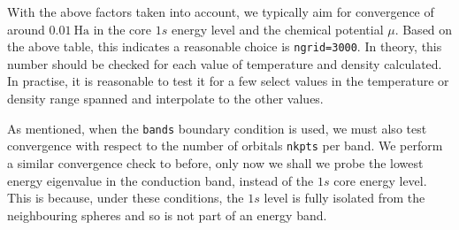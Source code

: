 \documentclass[preprint,aps]{revtex4-2}
\begin{document}
With the above factors taken into account, we typically aim for
convergence of around \(0.01\ \textrm{Ha}\) in the core \(1s\) energy
level and the chemical potential \(\mu\). Based on the above table, this
indicates a reasonable choice is \texttt{ngrid=3000}. In theory, this
number should be checked for each value of temperature and density
calculated. In practise, it is reasonable to test it for a few select
values in the temperature or density range spanned and interpolate to
the other values.

As mentioned, when the \texttt{bands} boundary condition is used, we
must also test convergence with respect to the number of orbitals
\texttt{nkpts} per band. We perform a similar convergence check to
before, only now we shall we probe the lowest energy eigenvalue in the
conduction band, instead of the \(1s\) core energy level. This is
because, under these conditions, the \(1s\) level is fully isolated from
the neighbouring spheres and so is not part of an energy band.
\end{document}
